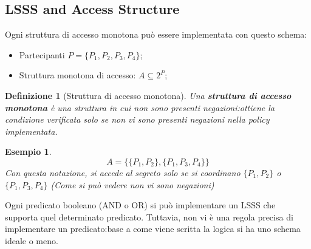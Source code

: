 \documentclass{book}
\newtheorem{Definizione}{\textbf{Definizione}}
\newtheorem{esempio}{\textcolor{Grey1}{Esempio}}
\begin{document}
\subsection{LSSS and Access Structure}
Ogni struttura di accesso monotona può essere implementata con questo schema:\begin{itemize}
    \item Partecipanti \(P= \{P_{1},P_{2},P_{3},P_{4}\} \);
    \item Struttura monotona di accesso: \(A\subseteq 2^{P}\);
\end{itemize}
\begin{Definizione}[Struttura di accesso monotona]
    Una \textbf{struttura di accesso monotona} è una struttura in cui non sono presenti negazioni:\@si ottiene la condizione verificata solo se non vi sono presenti negazioni nella policy implementata.
\end{Definizione}
\begin{esempio}
    \begin{equation*}
        A=\{ \{P_{1},P_{2} \} , \{P_{1},P_{3},P_{4} \} \}
    \end{equation*}
    Con questa notazione, si accede al segreto solo se si coordinano \( \{P_{1},P_{2} \} \) o \( \{P_{1},P_{3},P_{4} \} \) \emph{(Come si può vedere non vi sono negazioni)}
\end{esempio}
Ogni predicato booleano (AND o OR) si può implementare un LSSS che supporta quel determinato predicato\@. Tuttavia, non vi è una regola precisa di implementare un predicato:\@in base a come viene scritta la logica si ha uno schema ideale o meno\@.
\end{document}
